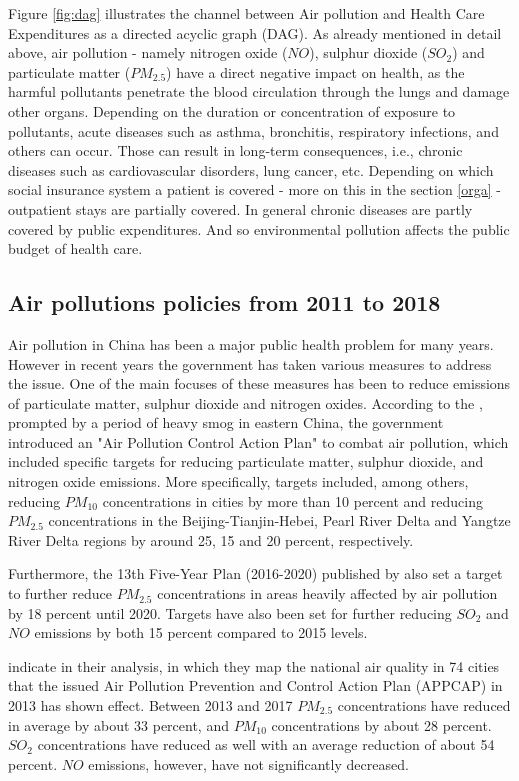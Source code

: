 \documentclass[
]{article}
\begin{document}
Figure \ref{fig:dag} illustrates the channel between Air pollution and Health Care Expenditures as a directed acyclic graph (DAG). As already mentioned in detail above, air pollution - namely nitrogen oxide ($NO$), sulphur dioxide ($SO_2$) and particulate matter ($PM_{2.5}$) have a direct negative impact on health, as the harmful pollutants penetrate the blood circulation through the lungs and damage other organs. Depending on the duration or concentration of exposure to pollutants, acute diseases such as asthma, bronchitis, respiratory infections, and others can occur. Those can result in long-term consequences, i.e., chronic diseases such as cardiovascular disorders, lung cancer, etc.  
Depending on which social insurance system a patient is covered - more on this in the section \ref{orga} - outpatient stays are partially covered. In general chronic diseases are partly covered by public expenditures. And so environmental pollution affects the public budget of health care. 
	
	
	\subsection{Air pollutions policies from 2011 to 2018}
	
	Air pollution in China has been a major public health problem for many years. However in recent years the government has taken various measures to address the issue. One of the main focuses of these measures has been to reduce emissions of particulate matter, sulphur dioxide and nitrogen oxides. 
	According to the \cite{china2013}, prompted by a period of heavy smog in eastern China, the government introduced an "Air Pollution Control Action Plan" to combat air pollution, which included specific targets for reducing particulate matter, sulphur dioxide, and nitrogen oxide emissions. More specifically, targets included, among others, reducing $PM_{10}$ concentrations in cities by more than 10 percent and reducing $PM_{2.5}$ concentrations in the Beijing-Tianjin-Hebei, Pearl River Delta and Yangtze River Delta regions by  around 25, 15 and 20 percent, respectively. 
	
	Furthermore, the 13th Five-Year Plan (2016-2020) published by \cite{china2016} also set a target to further reduce $PM_{2.5}$ concentrations in areas heavily affected by air pollution by 18 percent until 2020. Targets have also been set for further reducing $SO_2$ and $NO$ emissions by both 15 percent compared to 2015 levels. 
	
	\cite{HUANG2018e313} indicate in their analysis, in which they map the national air quality in 74 cities that the issued Air Pollution Prevention and Control Action Plan (APPCAP) in 2013 has shown effect. Between 2013 and 2017 $PM_{2.5}$ concentrations have reduced in average by about 33 percent, and $PM_{10}$ concentrations by about 28 percent. $SO_2$ concentrations have reduced as well with an average reduction of about 54 percent. $NO$ emissions, however, have not significantly decreased. 
	
\end{document}
